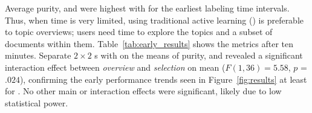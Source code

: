 Average purity,  and  were highest with  for
the earliest labeling time intervals.  Thus, when time is very
limited, using traditional active learning () is preferable to
topic overviews; users need time to explore the topics and a subset of
documents within them. Table~\ref{tab:early_results} shows the metrics
after ten minutes. Separate $2\times2$ s with  on
the means of purity,  and  revealed a significant
interaction effect between \emph{overview} and \emph{selection} on
mean  ($F(1,36)= 5.58$, $p$ = $.024$), confirming the early
performance trends seen in Figure~\ref{fig:results} at least for
. No other main or interaction effects were significant,
likely due to low statistical power.

\begin{table}[t!]
\small
{}
\caption{Mean, standard deviation, and median purity, , and 
  after ten minutes.  in particular shows the benefit of  over other conditions at early time intervals.}
\label{tab:early_results}
\end{table}



